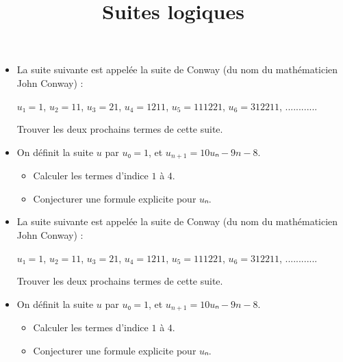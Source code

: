 \documentclass[
	classe=$1^{ere}STI2D$,
	landscape,
	twocolumn
]{exercice}
\title{Suites logiques}
\begin{document}
\newcommand{\Bonus}{
	\maketitle

	\begin{itemize}
		\item La suite suivante est appelée la suite de Conway (du nom du mathématicien John Conway) :

		      $u₁ = 1$, $u_2 = 11$, $u_3 = 21$, $u_4 = 1211$, $u_5 = 111221$, $u_6 = 312211$, ............


		      Trouver les deux prochains termes de cette suite.
		\item On définit la suite $u$ par $u₀ = 1$, et $u_{n+1} = 10uₙ - 9n - 8$.
		      \begin{itemize}
			      \item Calculer les termes d'indice $1$ à $4$.
			      \item Conjecturer une formule explicite pour $uₙ$.
		      \end{itemize}
	\end{itemize}
}

\Bonus

\newpage
\Bonus
\end{document}
